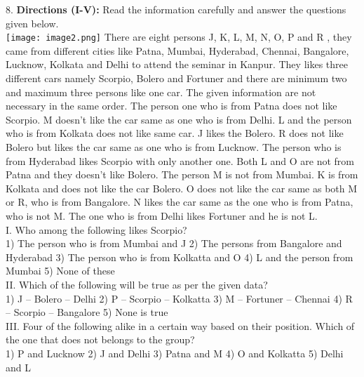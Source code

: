 \documentclass[
]{article}
\begin{document}
8. \textbf{Directions (I-V):} Read the information carefully and answer the questions given below.\\
\texttt{[image: image2.png]}
There are eight persons J, K, L, M, N, O, P and R , they came from different cities like Patna,
Mumbai, Hyderabad, Chennai, Bangalore, Lucknow, Kolkata and Delhi to attend the
seminar in Kanpur. They likes three different cars namely Scorpio, Bolero and Fortuner and
there are minimum two and maximum three persons like one car. The given information are
not necessary in the same order. The person one who is from Patna does not like Scorpio. M
doesn’t like the car same as one who is from Delhi. L and the person who is from Kolkata
does not like same car. J likes the Bolero. R does not like Bolero but likes the car same as one
who is from Lucknow. The person who is from Hyderabad likes Scorpio with only another
one. Both L and O are not from Patna and they doesn't like Bolero. The person M is not from
Mumbai. K is from Kolkata and does not like the car Bolero. O does not like the car same as
both M or R, who is from Bangalore. N likes the car same as the one who is from Patna, who
is not M. The one who is from Delhi likes Fortuner and he is not L.\\

I. Who among the following likes Scorpio?\\
1) The person who is from Mumbai and J \hspace{2mm}2) The persons from Bangalore and Hyderabad
\hspace{2mm}3) The person who is from Kolkatta and O \hspace{2mm}4) L and the person from Mumbai
\hspace{2mm}5) None of these\\

II. Which of the following will be true as per the given data?\\
1) J – Bolero – Delhi \hspace{2mm}2) P – Scorpio – Kolkatta \hspace{2mm}3) M – Fortuner – Chennai
\hspace{2mm}4) R – Scorpio – Bangalore \hspace{2mm}5) None is true\\

III. Four of the following alike in a certain way based on their position. Which of the one that
does not belongs to the group?\\
1) P and Lucknow \hspace{2mm}2) J and Delhi \hspace{2mm}3) Patna and M
\hspace{2mm}4) O and Kolkatta \hspace{2mm}5) Delhi and L\\
\end{document}
